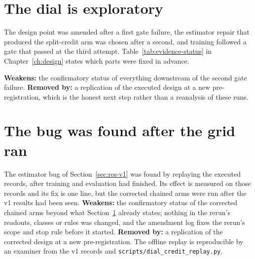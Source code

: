 \section{The dial is exploratory}
\label{sec:lim-exploratory}

The design point was amended after a first gate failure, the estimator
repair that produced the split-credit arm was chosen after a second, and
training followed a gate that passed at the third attempt.
Table~\ref{tab:evidence-status} in Chapter~\ref{ch:design} states which parts were
fixed in advance.

\textbf{Weakens:} the confirmatory status of everything downstream of the
second gate failure.
\textbf{Removed by:} a replication of the executed design at a new
pre-registration, which is the honest next step rather than a reanalysis of
these runs.

\section{The bug was found after the grid ran}
\label{sec:lim-diagnostic}

The estimator bug of Section~\ref{sec:res-v1} was found by replaying the
executed records, after training and evaluation had finished.
Its effect is measured on those records and its fix is one line, but the
corrected chained arms were run after the v1 results had been seen.
\textbf{Weakens:} the confirmatory status of the corrected chained arms
beyond what Section~\ref{sec:lim-exploratory} already states; nothing in
the rerun's readouts, classes or rules was changed, and the amendment log
fixes the rerun's scope and stop rule before it started.
\textbf{Removed by:} a replication of the corrected design at a new
pre-registration.
The offline replay is reproducible by an examiner from the v1 records and
\texttt{scripts/dial\_credit\_replay.py}.
